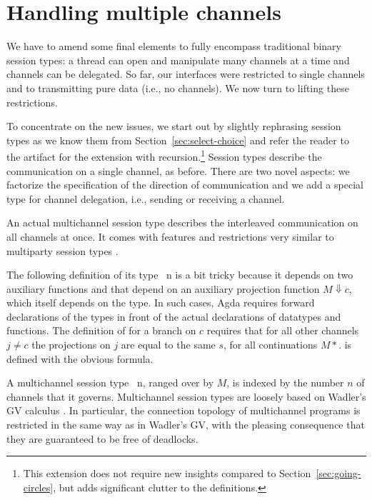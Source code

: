 \documentclass[acmsmall,screen]{acmart}
\begin{document}
\section{Handling multiple channels}
\label{sec:handl-mult-chann}


We have to amend some final elements to fully encompass traditional binary
session types: a thread can open and manipulate many channels at a
time and channels can be delegated. So far, our interfaces were
restricted to single channels and to transmitting pure data (i.e., no channels). We
now turn to lifting these restrictions.

To concentrate on the new issues, 
we start out by slightly rephrasing session types as we
know them from Section~\ref{sec:select-choice} and
refer the reader to the artifact for the extension with
recursion.\footnote{This extension does not require new insights
  compared to Section~\ref{sec:going-circles}, but
  adds significant clutter to the definitions.} Session types describe
the communication on a single channel, as before. There are two novel
aspects: we factorize the specification of the direction of
communication and we add a special type for channel delegation, i.e.,
sending or receiving a channel.

\multiSession

An actual multichannel session type describes the interleaved
communication on all channels at once. It comes with features and
restrictions very similar to multiparty session types
\cite{DBLP:journals/jacm/HondaYC16}.

The following definition of its type  {\AMSession~n} is a bit tricky
because it depends on two auxiliary functions {\ACausality} and
{\ACheckDual} that depend on an auxiliary projection function
{$M\Downarrow c$}, 
which itself depends on the {\AMSession} type. In such cases, Agda
requires forward declarations of the types in front of the actual
declarations of datatypes and functions. The definition of
{\ACausality} for a branch on $c$ requires that for all other channels $j\ne c$ the
projections on $j$ are equal to the same $s$, for all continuations
$M*$.
{\ACheckDual} is defined with the obvious formula.

\multiMSessionSignature

A multichannel session type {\AMSession~n}, ranged over by $M$, is indexed by the number $n$ of
channels that it governs. Multichannel session types are loosely based on Wadler's GV
calculus \cite{DBLP:journals/jfp/Wadler14}. In particular, the
connection topology of multichannel programs is restricted in the same
way as in Wadler's GV, with the pleasing
consequence that they are guaranteed to be free of deadlocks.
\end{document}
